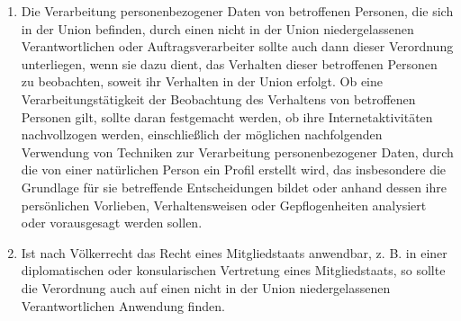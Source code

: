 \begin{enumerate}

   \item Die Verarbeitung personenbezogener Daten von betroffenen Personen, die sich in der Union befinden, durch einen
    nicht in der Union niedergelassenen Verantwortlichen oder Auftragsverarbeiter sollte auch dann dieser Verordnung
    unterliegen, wenn sie dazu dient, das Verhalten dieser betroffenen Personen zu beobachten, soweit ihr Verhalten in
    der Union erfolgt. Ob eine Verarbeitungstätigkeit der Beobachtung des Verhaltens von betroffenen Personen gilt,
    sollte daran festgemacht werden, ob ihre Internetaktivitäten nachvollzogen werden, einschließlich der möglichen
    nachfolgenden Verwendung von Techniken zur Verarbeitung personenbezogener Daten, durch die von einer natürlichen
    Person ein Profil erstellt wird, das insbesondere die Grundlage für sie betreffende Entscheidungen bildet oder
    anhand dessen ihre persönlichen Vorlieben, Verhaltensweisen oder Gepflogenheiten analysiert oder vorausgesagt
    werden sollen.%
   \label{itm:eg-24}
   

   \item Ist nach Völkerrecht das Recht eines Mitgliedstaats anwendbar, z. B. in einer diplomatischen oder
    konsularischen Vertretung eines Mitgliedstaats, so sollte die Verordnung auch auf einen nicht in der Union
    niedergelassenen Verantwortlichen Anwendung finden.%
   \label{itm:eg-25}
   


\end{enumerate}

